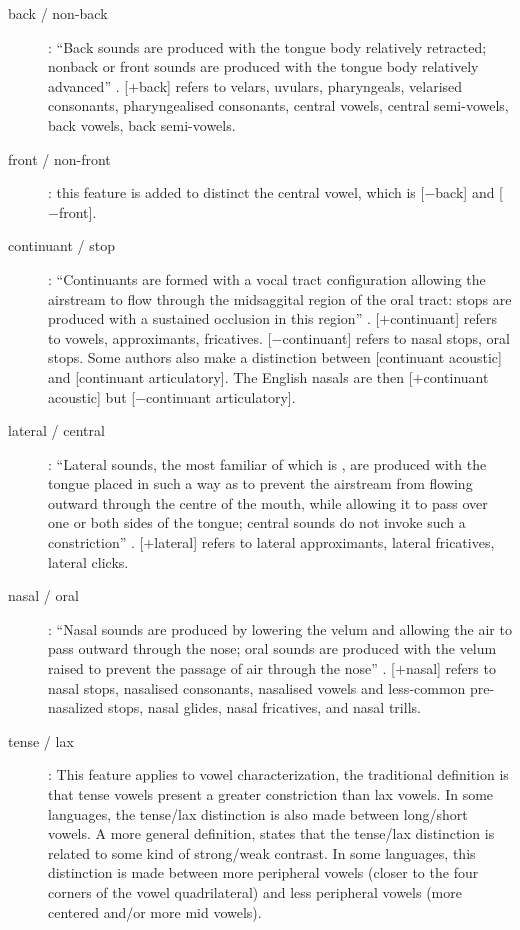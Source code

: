 \begin{description}
\item[back / non-back] : ``Back sounds are produced with the tongue body relatively retracted; nonback or front sounds are produced with the tongue body relatively advanced'' \citep{chomsky1968a}. [$+$back] refers to velars, uvulars, pharyngeals, velarised consonants, pharyngealised consonants, central vowels, central semi-vowels, back vowels, back semi-vowels.

\item[front / non-front] : this feature is added to distinct the central vowel, which is [$-$back] and [$-$front].

\item[continuant / stop] : ``Continuants are formed with a vocal tract configuration allowing the airstream to flow through the midsaggital region of the oral tract: stops are produced with a sustained occlusion in this region'' \citep{chomsky1968a}. [$+$continuant] refers to vowels, approximants, fricatives. [$-$continuant] refers to nasal stops, oral stops. Some authors also make a distinction between [continuant acoustic] and [continuant articulatory]. The English nasals \textipa{[m,n,N]} are then [$+$continuant acoustic] but [$-$continuant articulatory].

\item[lateral / central] : ``Lateral sounds, the most familiar of which is \textipa{[l]}, are produced with the tongue placed in such a way as to prevent the airstream from flowing outward through the centre of the mouth, while allowing it to pass over one or both sides of the tongue; central sounds do not invoke such a constriction'' \citep{chomsky1968a}. [$+$lateral] refers to lateral approximants, lateral fricatives, lateral clicks.

\item[nasal / oral] : ``Nasal sounds are produced by lowering the velum and allowing the air to pass outward through the nose; oral sounds are produced with the velum raised to prevent the passage of air through the nose'' \citep{chomsky1968a}. [$+$nasal] refers to nasal stops, nasalised consonants, nasalised vowels and  less-common pre-nasalized stops, nasal glides, nasal fricatives, and nasal trills.

\item[tense / lax] : This feature applies to vowel characterization, the traditional definition is that tense vowels present a greater constriction than lax vowels. In some languages, the tense/lax distinction is also made between long/short vowels. A more general definition, states that the tense/lax distinction is related to some kind of strong/weak contrast. In some languages, this distinction is made between more peripheral vowels (closer to the four corners of the vowel quadrilateral) and less peripheral vowels (more centered and/or more mid vowels).


\end{description}

